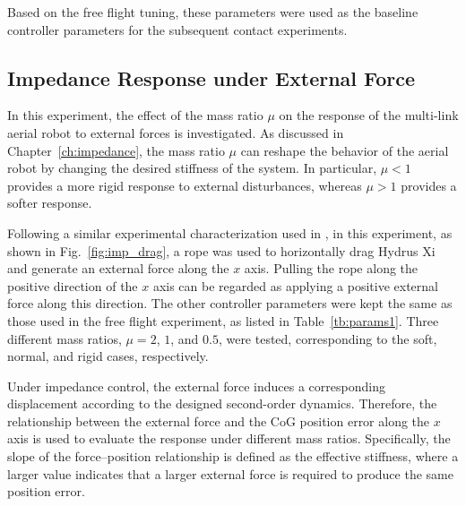 Based on the free flight tuning, these parameters were used as the baseline controller parameters for the subsequent contact experiments.

\subsection{Impedance Response under External Force}
\label{sec:impedance_parameter}

In this experiment, the effect of the mass ratio $\mu$ on the response of the multi-link aerial robot to external forces is investigated. As discussed in Chapter~\ref{ch:impedance}, the mass ratio $\mu$ can reshape the behavior of the aerial robot by changing the desired stiffness of the system. In particular, $\mu<1$ provides a more rigid response to external disturbances, whereas $\mu>1$ provides a softer response.

Following a similar experimental characterization used in \cite{bodie_2020_active}, in this experiment, as shown in Fig.~\ref{fig:imp_drag}, a rope was used to horizontally drag Hydrus Xi and generate an external force along the $x$ axis. Pulling the rope along the positive direction of the $x$ axis can be regarded as applying a positive external force along this direction. The other controller parameters were kept the same as those used in the free flight experiment, as listed in Table~\ref{tb:params1}. Three different mass ratios, $\mu=2$, $1$, and $0.5$, were tested, corresponding to the soft, normal, and rigid cases, respectively. 

Under impedance control, the external force induces a corresponding displacement according to the designed second-order dynamics. Therefore, the relationship between the external force and the CoG position error along the $x$ axis is used to evaluate the response under different mass ratios. Specifically, the slope of the force--position relationship is defined as the effective stiffness, where a larger value indicates that a larger external force is required to produce the same position error.






